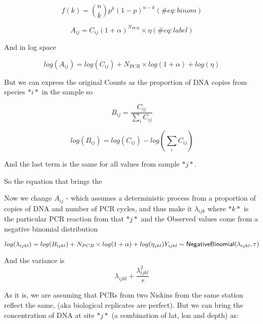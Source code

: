 \documentclass[
]{article}
\begin{document}
\begin{equation} 
  f\left(k\right) = \binom{n}{k} p^k\left(1-p\right)^{n-k}
  (\#eq:binom)
\end{equation}

\begin{equation}

 A_{ij} = C_{ij}(1+\alpha)^{N_{PCR}} \times  \eta 
 (\#eq:label)
\end{equation}

And in log space

\begin{equation}
log(A_{ij}) = log (C_{ij}) + N_{PCR} \times log(1+\alpha) + log (\eta)
\end{equation}

But we can express the original Counts as the proportion of DNA copies
from species \(*i*\) in the sample so

\begin{equation}
 B_{ij} = \frac{C_{ij}}{\sum_{i}C_{ij}} 
\end{equation}

\begin{equation}
log(B_{ij}) = log(C_{ij}) - log(\sum_i C_{ij})
\end{equation}

And the last term is the same for all values from sample \(*j*\).

So the equation that brings the

Now we change \(A_{ij}\) - which assumes a deterministic process from a
proportion of copies of DNA and number of PCR cycles, and thus make it
\(\lambda_{ijk}\) where \(*k*\) is the particular PCR reaction from that
\(*j*\) and the Observed values come from a negative binomial
distribution

\begin{equation}
log(\lambda_{ijkl}) = log(B_{ijkl})  + N_{PCR} \times log(1+\alpha) + log (\eta_{jkl}) \\ Y_{ijkl} \sim {\sf NegativeBinomial}(\lambda_{ijkl}, \tau)

\end{equation}

And the variance is \begin{equation}
\lambda_{ijkl} + \frac{\lambda^2_{ijkl}}{\tau}
\end{equation}

As it is, we are assuming that PCRs from two Niskins from the same
station reflect the same, (aka biological replicates are perfect). But
we can bring the concentration of DNA at site \(*j*\) (a combination of
lat, lon and depth) as:
\end{document}
